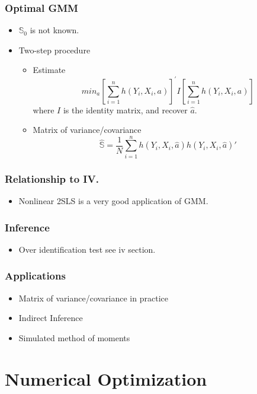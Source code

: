 \documentclass{beamer}
\newcommand{\1}{\mathbb{1}}
\begin{document}
\begin{frame}\frametitle{Optimal GMM}
\begin{itemize}
\item $\mathbb{S}_0$ is not known.
\item Two-step procedure
\begin{itemize}
\item Estimate 
\begin{equation*}
min_a \left[ \sum_{i=1}^{n} h(Y_i,X_i,a) \right]^{'} I \left[ \sum_{i=1}^{n} h(Y_i,X_i,a) \right]
\end{equation*}
where $I$ is the identity matrix, and recover $\hat{a}$.
\item Matrix of variance/covariance
\begin{equation*}
\hat{\mathbb{S}} = \dfrac{1}{N} \sum_{i=1}^{n} h(Y_i,X_i,\hat{a}) h(Y_i,X_i,\hat{a})'
\end{equation*}
\end{itemize}
\end{itemize}
\end{frame}

\begin{frame}\frametitle{Relationship to IV.}
\begin{itemize}
\item Nonlinear 2SLS is a very good application of GMM.
\end{itemize}
\end{frame}

\begin{frame}\frametitle{Inference}
\begin{itemize}
\item Over identification test see iv section.
\end{itemize}
\end{frame}

\begin{frame}\frametitle{Applications}
\begin{itemize}
\item Matrix of variance/covariance in practice
\item Indirect Inference
\item Simulated method of moments
\end{itemize}
\end{frame}

\section{Numerical Optimization}
\end{document}
